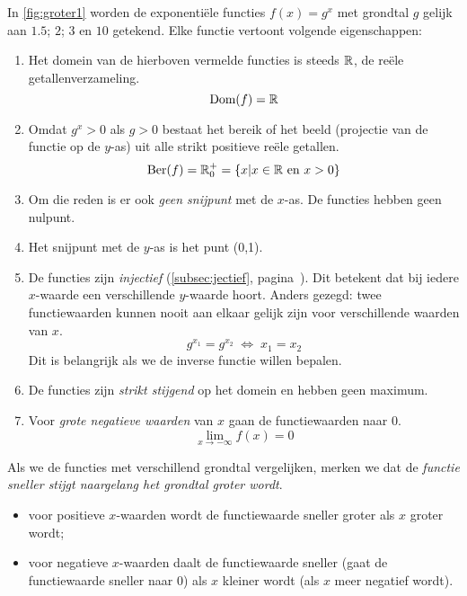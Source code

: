 In \cref{fig:groter1} worden de exponenti\"ele functies $f(x)=g^x$ met grondtal $g$ gelijk aan $\num{1.5}$; $2$; $3$ en $10$ getekend. Elke functie vertoont volgende eigenschappen: 
\begin{enumerate}
    \item  Het domein van de hierboven vermelde functies is steeds $\mathbb{R}$, de re\"{e}le
    getallenverzameling.
    \[
      \text{Dom}(f)=\mathbb{R}
    \]

    \item  Omdat $g^x>0$ als $g>0$ bestaat het bereik of het beeld (projectie van de functie op de $y$-as) uit alle strikt positieve re\"{e}le getallen. 
    \[
      \text{Ber}(f)=\mathbb{R}^+_0=\{x|x\in \mathbb{R} \text{~en~} x>0\}
    \]
    
    \item Om die reden is er ook \emph{geen snijpunt} met de $x$-as. De functies hebben  geen nulpunt.

    \item  Het snijpunt met de $y$-as is het punt (0,1).

  
    \item  \label{exp_func:inject} De functies zijn \emph{injectief} (\cref{subsec:jectief}, pagina~\pageref{subsec:jectief}). Dit betekent dat bij iedere $x$-waarde een verschillende $y$-waarde hoort. Anders gezegd: twee
    functiewaarden  kunnen nooit aan elkaar gelijk zijn  voor
    verschillende waarden van $x$. 
        \begin{displaymath}
        g^{x_{1}}=g^{x_{2}}   \; \Leftrightarrow \; x_{1}=x_{2}
    \end{displaymath}
    Dit is belangrijk als we de inverse functie willen bepalen.
    
    \item  De functies zijn  \emph{strikt stijgend} op het domein en
    hebben geen maximum.

    \item  Voor \emph{grote negatieve waarden} van $x$ gaan de functiewaarden naar 0.
    \[
    \lim_{x\rightarrow-\infty}f(x)=0
    \]

\end{enumerate}
Als we de functies met verschillend grondtal vergelijken, merken we dat de \emph{functie sneller stijgt naargelang het grondtal groter wordt}. 
\begin{itemize}
\item voor positieve $x$-waarden wordt de functiewaarde sneller groter als $x$ groter wordt;
\item voor negatieve $x$-waarden daalt de functiewaarde sneller (gaat de functiewaarde sneller naar $0$) als  $x$ kleiner wordt (als $x$ meer negatief wordt).
\end{itemize}




